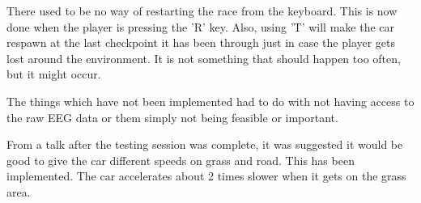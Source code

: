 There used to be no way of restarting the race from the keyboard. This is now done when the player is pressing the 'R' key. Also, using 'T' will make the car respawn at the last checkpoint it has been through just in case the player gets lost around the environment. It is not something that should happen too often, but it might occur.

The things which have not been implemented had to do with not having access to the raw EEG data or them simply not being feasible or important.

From a talk after the testing session was complete, it was suggested it would be good to give the car different speeds on grass and road. This has been implemented. The car accelerates about 2 times slower when it gets on the grass area.